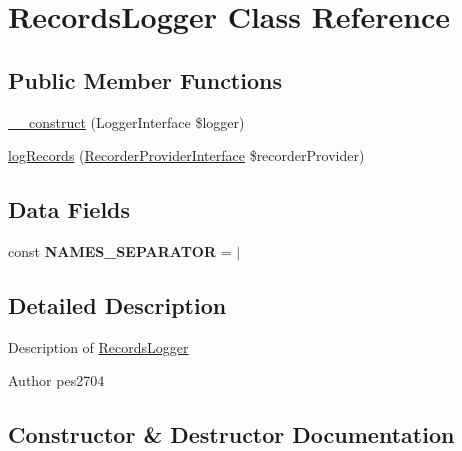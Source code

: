 \hypertarget{class_pes_1_1_view_1_1_recorder_1_1_records_logger}{}\section{Records\+Logger Class Reference}
\label{class_pes_1_1_view_1_1_recorder_1_1_records_logger}
\subsection*{Public Member Functions}
\begin{DoxyCompactItemize}
\item 
\mbox{\hyperlink{class_pes_1_1_view_1_1_recorder_1_1_records_logger_a2bd426f7ee55a596b1893454a77a006a}{\+\_\+\+\_\+construct}} (Logger\+Interface \$logger)
\item 
\mbox{\hyperlink{class_pes_1_1_view_1_1_recorder_1_1_records_logger_a8abb9ca59332646afa03e57f45262618}{log\+Records}} (\mbox{\hyperlink{interface_pes_1_1_view_1_1_recorder_1_1_recorder_provider_interface}{Recorder\+Provider\+Interface}} \$recorder\+Provider)
\end{DoxyCompactItemize}
\subsection*{Data Fields}
\begin{DoxyCompactItemize}
\item 
\mbox{\label{class_pes_1_1_view_1_1_recorder_1_1_records_logger_a391932a94ed8d6a2b9f1cf7efad473da}} 
const {\bfseries N\+A\+M\+E\+S\+\_\+\+S\+E\+P\+A\+R\+A\+T\+OR} = \textquotesingle{} $\vert$ \textquotesingle{}
\end{DoxyCompactItemize}


\subsection{Detailed Description}
Description of \mbox{\hyperlink{class_pes_1_1_view_1_1_recorder_1_1_records_logger}{Records\+Logger}}

\begin{DoxyAuthor}{Author}
pes2704 
\end{DoxyAuthor}


\subsection{Constructor \& Destructor Documentation}
\mbox{\label{class_pes_1_1_view_1_1_recorder_1_1_records_logger_a2bd426f7ee55a596b1893454a77a006a}} 
